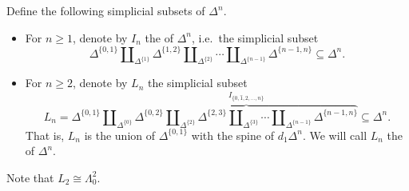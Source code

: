 \documentclass[main.tex]{subfiles}
\begin{document}
\begin{definition}
  Define the following simplicial subsets of $\Delta^{n}$.
  \begin{itemize}
    \item For $n \geq 1$, denote by $I_{n}$ the  of $\Delta^{n}$, i.e.\ the simplicial subset
      \begin{equation*}
        \Delta^{\{0, 1\}} \amalg_{\Delta^{\{1\}}} \Delta^{\{1, 2\}} \amalg_{\Delta^{\{2\}}} \cdots \amalg_{\Delta^{\{n-1\}}} \Delta^{\{n-1, n\}} \subseteq \Delta^{n}.
      \end{equation*}

    \item For $n \geq 2$, denote by $L_{n}$ the simplicial subset
      \begin{equation*}
        L_{n} = \Delta^{\{0, 1\}} \amalg_{\Delta^{\{0\}}} \overbrace{\Delta^{\{0, 2\}} \amalg_{\Delta^{\{2\}}} \Delta^{\{2, 3\}} \amalg_{\Delta^{\{3\}}}\cdots \amalg_{\Delta^{\{n-1\}}} \Delta^{\{n-1, n\}}}^{I_{\{0, \hat{1}, 2, \ldots, n\}}} \subseteq \Delta^{n}.
      \end{equation*}
      That is, $L_{n}$ is the union of $\Delta^{\{0, 1\}}$ with the spine of $d_{1}\Delta^{n}$. We will call $L_{n}$ the  of $\Delta^{n}$.
  \end{itemize}
\end{definition}

Note that $L_{2} \cong \Lambda^{2}_{0}$.

\end{document}
